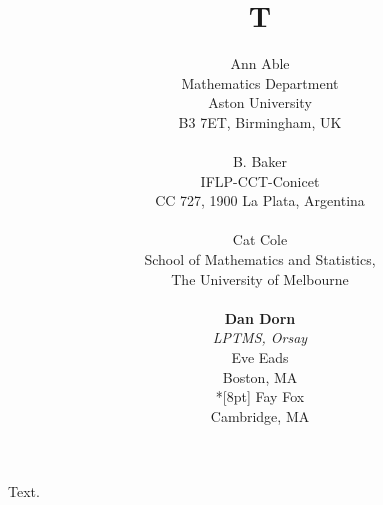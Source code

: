 \documentclass{article}
\title{T}
\author{Ann Able\\
Mathematics Department\\
Aston University\\
B3 7ET, Birmingham, UK\\
\vspace{0.1cm}\\
B. Baker\\
IFLP-CCT-Conicet\\
CC 727, 1900 La Plata, Argentina\\
\\
Cat Cole\\
School of Mathematics and Statistics, \\The University of Melbourne\\
$ $\\
{\bf Dan Dorn}\\
{\em LPTMS, Orsay}\\[12pt]
Eve Eads\\
Boston, MA\\*[8pt]
Fay Fox\\
Cambridge, MA}
\begin{document}
\maketitle
Text.
\end{document}
